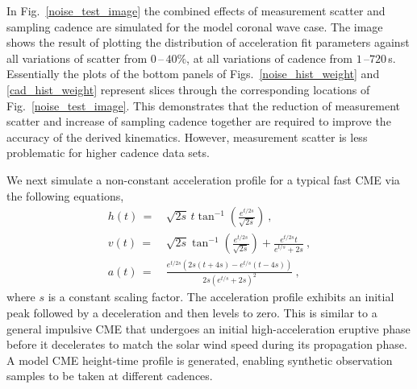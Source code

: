 \documentclass[structabstract]{aa}
\begin{document}
In Fig.~\ref{noise_test_image} the combined effects of measurement scatter and sampling cadence are simulated for the model coronal wave case. The image shows the result of plotting the distribution of acceleration fit parameters against all variations of scatter from $0$\,--\,$40\%$, at all variations of cadence from $1$\,--$720$\,s. Essentially the plots of the bottom panels of Figs.~\ref{noise_hist_weight} and \ref{cad_hist_weight} represent slices through the corresponding locations of Fig.~\ref{noise_test_image}. This demonstrates that the reduction of measurement scatter and increase of sampling cadence together are required to improve the accuracy of the derived kinematics. However, measurement scatter is less problematic for higher cadence data sets.

We next simulate a non-constant acceleration profile for a typical fast CME via the following equations,
\begin{eqnarray}
h(t)\,=&\,\sqrt{2s}\,t\tan^{-1}\left(\frac{e^{t/2s}}{\sqrt{2s}}\right) \ , \\
v(t)\,=&\,\sqrt{2s}\tan^{-1}\left(\frac{e^{t/2s}}{\sqrt{2s}}\right)+\frac{e^{t/2s}t}{e^{t/s}+2s} \ , \\
a(t)\,=&\,\frac{e^{t/2s}\left(2s\left(t+4s\right)-e^{t/s}\left(t-4s\right)\right)}{2s\left(e^{t/s}+2s\right)^2}\ ,
\label{eqn:nonconst_a}
\end{eqnarray}
where $s$ is a constant scaling factor. The acceleration profile exhibits an initial peak followed by a deceleration and then levels to zero. This is similar to a general impulsive CME that undergoes an initial high-acceleration eruptive phase before it decelerates to match the solar wind speed during its propagation phase. A model CME height-time profile is generated, enabling synthetic observation samples to be taken at different cadences. 
\end{document}
